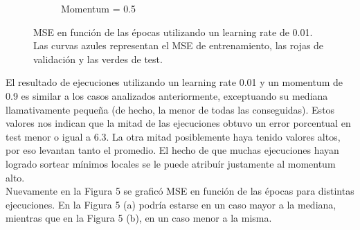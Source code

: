 \documentclass[12pt, a4paper]{article}
\begin{document}
\begin{figure}
\begin{subfigure}[b]{0.45\textwidth}
        \caption{Momentum = 0.5}
    \end{subfigure}    
    \caption{MSE en función de las épocas utilizando un learning rate de 0.01. Las curvas azules representan el MSE de entrenamiento, las rojas de validación y las verdes de test.}
\end{figure}

\bigskip

El resultado de ejecuciones utilizando un learning rate 0.01 y un momentum de 0.9 es similar a los casos analizados anteriormente, exceptuando su mediana llamativamente pequeña (de hecho, la menor de todas las conseguidas). Estos valores nos indican que la mitad de las ejecuciones obtuvo un error porcentual en test menor o igual a 6.3. La otra mitad posiblemente haya tenido valores altos, por eso levantan tanto el promedio. El hecho de que muchas ejecuciones hayan logrado sortear mínimos locales se le puede atribuír justamente al momentum alto. \\
Nuevamente en la Figura 5 se graficó MSE en función de las épocas para distintas ejecuciones. En la Figura 5 (a) podría estarse en un caso mayor a la mediana, mientras que en la Figura 5 (b), en un caso menor a la misma.
\end{document}

